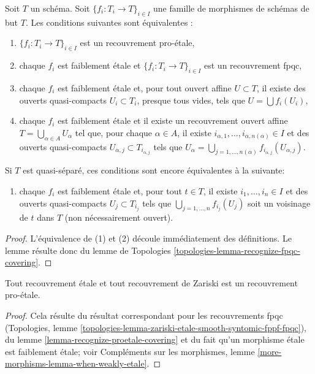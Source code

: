 \begin{lemma}
\label{lemma-recognize-proetale-covering}
Soit $T$ un schéma. Soit $\{f_i : T_i \to T\}_{i \in I}$ une famille de
morphismes de schémas de but $T$. Les conditions suivantes sont équivalentes :
\begin{enumerate}
\item $\{f_i : T_i \to T\}_{i \in I}$ est un recouvrement pro-\'etale,
\item chaque $f_i$ est faiblement \'etale et $\{f_i : T_i \to T\}_{i \in I}$
est un recouvrement fpqc,
\item chaque $f_i$ est faiblement \'etale et, pour tout ouvert affine $U \subset T$,
il existe des ouverts quasi-compacts $U_i \subset T_i$, presque tous vides,
tels que $U = \bigcup f_i(U_i)$,
\item chaque $f_i$ est faiblement \'etale et il existe un recouvrement ouvert affine
$T = \bigcup_{\alpha \in A} U_\alpha$ tel que, pour chaque $\alpha \in A$,
il existe $i_{\alpha, 1}, \ldots, i_{\alpha, n(\alpha)} \in I$
et des ouverts quasi-compacts $U_{\alpha, j} \subset T_{i_{\alpha, j}}$ tels que
$U_\alpha =
\bigcup_{j = 1, \ldots, n(\alpha)} f_{i_{\alpha, j}}(U_{\alpha, j})$.
\end{enumerate}
Si $T$ est quasi-séparé, ces conditions sont encore équivalentes à la suivante:
\begin{enumerate}
\item[(5)] chaque $f_i$ est faiblement \'etale et, pour tout $t \in T$, il existe
$i_1, \ldots, i_n \in I$ et des ouverts quasi-compacts $U_j \subset T_{i_j}$
tels que $\bigcup_{j = 1, \ldots, n} f_{i_j}(U_j)$ soit un
voisinage de $t$ dans $T$ (non nécessairement ouvert).
\end{enumerate}
\end{lemma}

\begin{proof}
L'équivalence de (1) et (2) découle immédiatement des définitions.
Le lemme résulte donc du
lemme de Topologies \ref{topologies-lemma-recognize-fpqc-covering}.
\end{proof}

\begin{lemma}
\label{lemma-etale-proetale}
Tout recouvrement \'etale et tout recouvrement de Zariski est un recouvrement pro-\'etale.
\end{lemma}

\begin{proof}
Cela résulte du résultat correspondant pour les recouvrements fpqc
(Topologies, lemme
\ref{topologies-lemma-zariski-etale-smooth-syntomic-fppf-fpqc}),
du lemme \ref{lemma-recognize-proetale-covering} et
du fait qu'un morphisme \'etale est faiblement \'etale; voir
Compléments sur les morphismes, lemme \ref{more-morphisms-lemma-when-weakly-etale}.
\end{proof}

